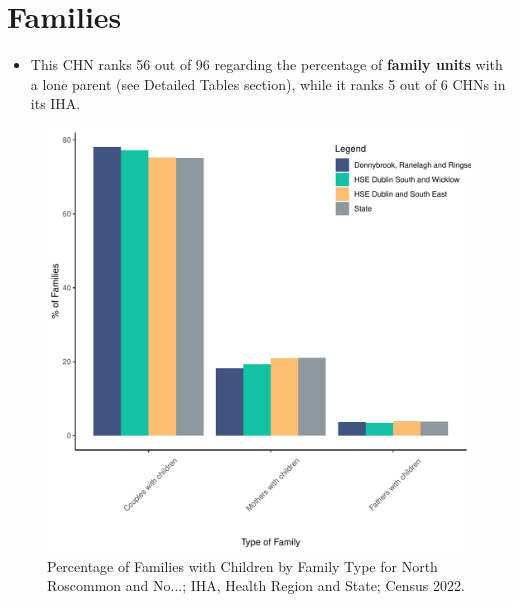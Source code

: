 \documentclass{article}
\begin{document}
\section{Families}\label{sect:Fam}
\begin{itemize}
\item This CHN ranks  56 out of 96 regarding the percentage of \textbf{family units} with a lone parent (see Detailed Tables section), while it ranks   5 out of 6 CHNs in its IHA.
\end{itemize}
\begin{figure}[H]
	\centering
	\includegraphics[width = 150mm]{../figures/FamED.pdf}
	\caption{Percentage of Families with Children by Family Type for North Roscommon and No...; IHA, Health Region and State; Census 2022.}
	\label{fig:vbnv}
	\end{figure}
	
\end{document}
